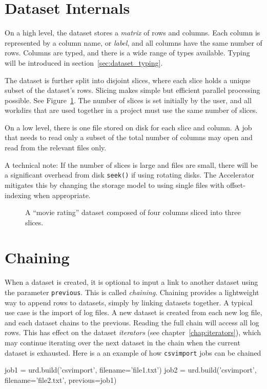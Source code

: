 \section{Dataset Internals}

On a high level, the dataset stores a \textsl{matrix} of rows and
columns.  Each column is represented by a column name,
or \emph{label}, and all columns have the same number of rows.
Columns are typed, and there is a wide range of types available.
Typing will be introduced in section~\ref{sec:dataset_typing}.

The dataset is further split into disjoint slices, where each slice
holds a unique subset of the dataset's rows.  Slicing makes simple but
efficient parallel processing possible.  See Figure~\ref{fig:slices}.
The number of slices is set initially by the user, and all workdirs
that are used together in a project must use the same number of
slices.

On a low level, there is one file stored on disk for each slice and
column.  A job that needs to read only a subset of the total number of
columns may open and read from the relevant files only.

A technical note: If the number of slices is large and files are
small, there will be a significant overhead from disk \texttt{seek()}
if using rotating disks.  The Accelerator mitigates this by changing
the storage model to using single files with offset-indexing when
appropriate.

\begin{figure}[b!]
  \begin{center}
     
     \caption{A ``movie rating'' dataset composed of four columns
              sliced into three slices.}
     \label{fig:slices}
  \end{center}
\end{figure}


\section{Chaining}
When a dataset is created, it is optional to input a link to another
dataset using the parameter \texttt{previous}.  This is called
\emph{chaining}.  Chaining provides a lightweight way to append rows
to datasets, simply by linking datasets together.  A typical use case
is the import of log files.  A new dataset is created from each new
log file, and each dataset chains to the previous.  Reading the full
chain will access all log rows.  This has effect on the dataset
\emph{iterators} (see chapter~\ref{chap:iterators}), which may continue iterating
over the next dataset in the chain when the current dataset is
exhausted.  Here is a an example of how \texttt{csvimport} jobs can be
chained
\begin{python}
job1 = urd.build('csvimport', filename='file1.txt')
job2 = urd.build('csvimport', filename='file2.txt', previous=job1)
\end{python}

